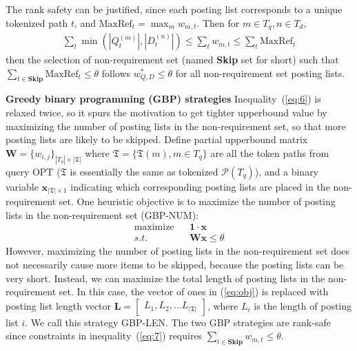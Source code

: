 \documentclass[runningheads]{llncs}
\begin{document}
The rank safety can be justified, since each posting list corresponds to a unique tokenized path $t$, and $\text{MaxRef}_t = \max_m w_{m, t}$. Then for $m \in T_q, n \in T_d$,
\begin{align}
\label{eq:6}
\sum_t \min(|Q^{(m)}_t|, |D^{(n)}_t|) \le \sum_t w_{m,t} \le \sum_t \text{MaxRef}_t
\end{align}
then the selection of non-requirement set (named \textbf{Skip} set for short) such that 
$\sum_{t \in \textbf{Skip}} \text{MaxRef}_t \le \theta$
follows $w^*_{Q, D} \le \theta$ for all non-requirement set posting lists.

\vspace{0.1in}
\noindent \textbf{Greedy binary programming (GBP) strategies}\;
%
Inequality~(\ref{eq:6}) is relaxed twice, so it spurs the motivation to get tighter upperbound value by maximizing the number of posting lists in the non-requirement set, so that more posting lists are likely to be skipped.
Define partial upperbound matrix $\mathbf{W} = \{ w_{i, j} \}_{|T_q| \times |\mathfrak{T}|} $ where $\mathfrak{T} = \{ \mathfrak{T}(m), m \in T_q \}$ are all the token paths from query OPT ($\mathfrak{T}$ is essentially the same as tokenized $\mathcal{P}(T_q)$), and a binary variable $\boldsymbol{x}_{|\mathfrak{T}| \times 1}$ indicating which corresponding posting lists are placed in the non-requirement set.
One heuristic objective is to maximize the number of posting lists in the non-requirement set (GBP-NUM):
\begin{align}
\label{eq:obj}
\text{maximize} && \mathbf{1} \cdot \boldsymbol{x} \\
\label{eq:7}
s.t.            && \mathbf{W} \boldsymbol{x} \le \theta
\end{align}
However, maximizing the number of posting lists in the non-requirement set does not necessarily cause more items to be skipped, because the posting lists can be very short.
Instead, we can maximize the total length of posting lists in the non-requirement set. In this case, the vector of ones in (\ref{eq:obj}) is replaced with posting list length vector
$\mathbf{L} = \begin{bmatrix} L_1, L_2, \ldots L_{|\mathfrak{T}|}\end{bmatrix}$, where $L_i$ is the length of posting list $i$.
We call this strategy GBP-LEN.
%
The two GBP strategies are rank-safe %
since constraints in inequality~(\ref{eq:7}) requires $\sum_{t \in \textbf{Skip}} w_{m,t} \le \theta$.
\end{document}
